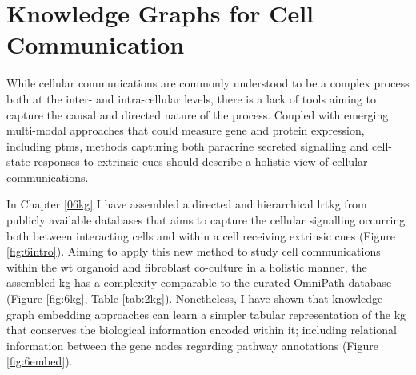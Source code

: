 
\section{Knowledge Graphs for Cell Communication}

While cellular communications are commonly understood to be a complex process both at the inter- and intra-cellular levels, there is a lack of tools aiming to capture the causal and directed nature of the process. Coupled with emerging multi-modal approaches that could measure gene and protein expression, including \acrshort{ptm}s, methods capturing both paracrine secreted signalling and cell-state responses to extrinsic cues should describe a holistic view of cellular communications.

In Chapter \ref{06kg} I have assembled a directed and hierarchical \acrfull{lrtkg} from publicly available databases that aims to capture the cellular signalling occurring both between interacting cells and within a cell receiving extrinsic cues (Figure \ref{fig:6intro}). Aiming to apply this new method to study cell communications within the \acrshort{wt} organoid and fibroblast co-culture in a holistic manner, the assembled \acrshort{kg} has a complexity comparable to the curated OmniPath database (Figure \ref{fig:6kg}, Table \ref{tab:2kg}). Nonetheless, I have shown that knowledge graph embedding approaches can learn a simpler tabular representation of the \acrshort{kg} that conserves the biological information encoded within it; including relational information between the gene nodes regarding pathway annotations (Figure \ref{fig:6embed}). 

